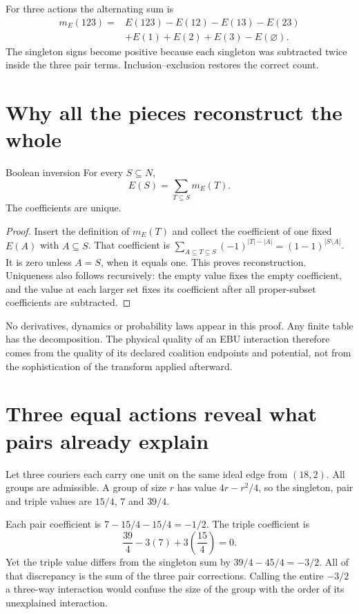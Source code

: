 For three actions the alternating sum is
\begin{align}\label{eq:triple-main}
 m_E(123)={}&E(123)-E(12)-E(13)-E(23)\nonumber\\
            &+E(1)+E(2)+E(3)-E(\varnothing).
\end{align}
The singleton signs become positive because each singleton was subtracted twice inside the three pair terms. Inclusion--exclusion restores the correct count.

\section{Why all the pieces reconstruct the whole}
\begin{theorem}{Boolean inversion}\label{thm:inversion}
For every $S\subseteq N$,
\begin{equation}\label{eq:inversion}
 E(S)=\sum_{T\subseteq S}m_E(T).
\end{equation}
The coefficients are unique.
\end{theorem}
\begin{proof}
Insert the definition of $m_E(T)$ and collect the coefficient of one fixed $E(A)$ with $A\subseteq S$. That coefficient is
$\sum_{A\subseteq T\subseteq S}(-1)^{|T|-|A|}=(1-1)^{|S\setminus A|}$.
It is zero unless $A=S$, when it equals one. This proves reconstruction. Uniqueness also follows recursively: the empty value fixes the empty coefficient, and the value at each larger set fixes its coefficient after all proper-subset coefficients are subtracted.
\end{proof}

No derivatives, dynamics or probability laws appear in this proof. Any finite table has the decomposition. The physical quality of an EBU interaction therefore comes from the quality of its declared coalition endpoints and potential, not from the sophistication of the transform applied afterward.

\section{Three equal actions reveal what pairs already explain}
Let three couriers each carry one unit on the same ideal edge from $(18,2)$. All groups are admissible. A group of size $r$ has value $4r-r^2/4$, so the singleton, pair and triple values are $15/4$, $7$ and $39/4$.

Each pair coefficient is $7-15/4-15/4=-1/2$. The triple coefficient is
\begin{equation}
 \frac{39}{4}-3(7)+3\left(\frac{15}{4}\right)=0.
\end{equation}
Yet the triple value differs from the singleton sum by $39/4-45/4=-3/2$. All of that discrepancy is the sum of the three pair corrections. Calling the entire $-3/2$ a three-way interaction would confuse the size of the group with the order of its unexplained interaction.


